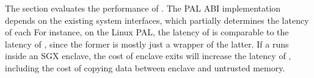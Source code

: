 



The section evaluates the performance of \thehostabi{}.
The PAL ABI implementation depends on the existing system interfaces,
which partially determines the latency of each \hostapi{} 
For instance, on the Linux PAL, the latency of  is comparable to the latency of ,
since the former is mostly just
a wrapper of the latter.
If a \picoproc{} runs inside an SGX enclave,
the cost of enclave exits will increase
the latency of \hostapis{},
including the cost of copying data between enclave and untrusted memory.


